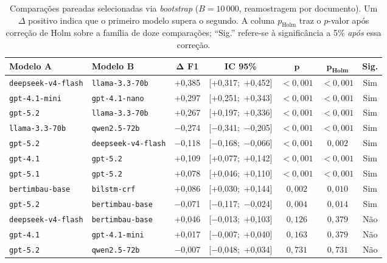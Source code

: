 \begin{table}[ht]
    \centering
    \caption{Comparações pareadas selecionadas via \textit{bootstrap} ($B = 10\,000$, reamostragem por documento). Um $\Delta$ positivo indica que o primeiro modelo supera o segundo. A coluna $p_{\text{Holm}}$ traz o $p$-valor após correção de Holm sobre a família de doze comparações; ``Sig.'' refere-se à significância a 5\% \emph{após} essa correção.}
    \label{tab:bootstrap_paired}
    \footnotesize
    \setlength{\tabcolsep}{4pt}
    \begin{tabular}{llccccc}
        \hline
        \textbf{Modelo A} & \textbf{Modelo B} & $\mathbf{\Delta}$ \textbf{F1} & \textbf{IC 95\%} & $\mathbf{p}$ & $\mathbf{p_{\text{Holm}}}$ & \textbf{Sig.} \\
        \hline
        \texttt{deepseek-v4-flash}     & \texttt{llama-3.3-70b}         & +0,385 & [+0,317;\ +0,452] & $< 0{,}001$ & $< 0{,}001$ & Sim \\
        \texttt{gpt-4.1-mini}          & \texttt{gpt-4.1-nano}          & +0,297 & [+0,251;\ +0,343] & $< 0{,}001$ & $< 0{,}001$ & Sim \\
        \texttt{gpt-5.2}               & \texttt{llama-3.3-70b}         & +0,267 & [+0,197;\ +0,336] & $< 0{,}001$ & $< 0{,}001$ & Sim \\
        \texttt{llama-3.3-70b}         & \texttt{qwen2.5-72b}           & $-$0,274 & [$-$0,341;\ $-$0,205] & $< 0{,}001$ & $< 0{,}001$ & Sim \\
        \texttt{gpt-5.2}               & \texttt{deepseek-v4-flash}     & $-$0,118 & [$-$0,168;\ $-$0,066] & $< 0{,}001$ & $0{,}002$ & Sim \\
        \texttt{gpt-4.1}               & \texttt{gpt-5.2}               & +0,109 & [+0,077;\ +0,142] & $< 0{,}001$ & $< 0{,}001$ & Sim \\
        \texttt{gpt-5.1}               & \texttt{gpt-5.2}               & +0,078 & [+0,046;\ +0,110] & $< 0{,}001$ & $< 0{,}001$ & Sim \\
        \texttt{bertimbau-base}        & \texttt{bilstm-crf}            & +0,086 & [+0,030;\ +0,144] & $0{,}002$   & $0{,}010$ & Sim \\
        \texttt{gpt-5.2}               & \texttt{bertimbau-base}        & $-$0,071 & [$-$0,117;\ $-$0,024] & $0{,}004$   & $0{,}014$ & Sim \\
        \texttt{deepseek-v4-flash}     & \texttt{bertimbau-base}        & +0,046 & [$-$0,013;\ +0,103] & $0{,}126$   & $0{,}379$ & Não \\
        \texttt{gpt-4.1}               & \texttt{gpt-4.1-mini}          & +0,017 & [$-$0,007;\ +0,040] & $0{,}163$   & $0{,}379$ & Não \\
        \texttt{gpt-5.2}               & \texttt{qwen2.5-72b}           & $-$0,007 & [$-$0,048;\ +0,034] & $0{,}731$   & $0{,}731$ & Não \\
        \hline
    \end{tabular}
\end{table}


